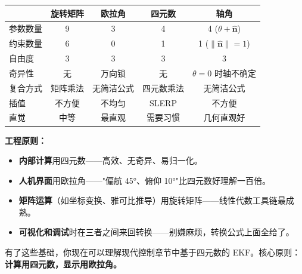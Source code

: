 \begin{center}
\begin{tabular}{lcccc}
\hline
& \textbf{旋转矩阵} & \textbf{欧拉角} & \textbf{四元数} & \textbf{轴角} \\
\hline
参数数量 & 9 & 3 & 4 & 4 ($\theta + \hat{\mathbf{n}}$) \\
约束数量 & 6 & 0 & 1 & 1 ($\|\hat{\mathbf{n}}\| = 1$) \\
自由度 & 3 & 3 & 3 & 3 \\
奇异性 & 无 & 万向锁 & 无 & $\theta = 0$ 时轴不确定 \\
复合方式 & 矩阵乘法 & 无简洁公式 & 四元数乘法 & 无简洁公式 \\
插值 & 不方便 & 不均匀 & SLERP & 不方便 \\
直觉 & 中等 & 最直观 & 需要习惯 & 几何直观好 \\
\hline
\end{tabular}
\end{center}

\textbf{工程原则：}
\begin{itemize}
    \item \textbf{内部计算}用四元数——高效、无奇异、易归一化。
    \item \textbf{人机界面}用欧拉角——"偏航 45°、俯仰 10°"比四元数好理解一百倍。
    \item \textbf{矩阵运算}（如坐标变换、雅可比推导）用旋转矩阵——线性代数工具链最成熟。
    \item \textbf{可视化和调试}时在三者之间来回转换——别嫌麻烦，转换公式上面全给了。
\end{itemize}

有了这些基础，你现在可以理解现代控制章节中基于四元数的 EKF。核心原则：\textbf{计算用四元数，显示用欧拉角。}
